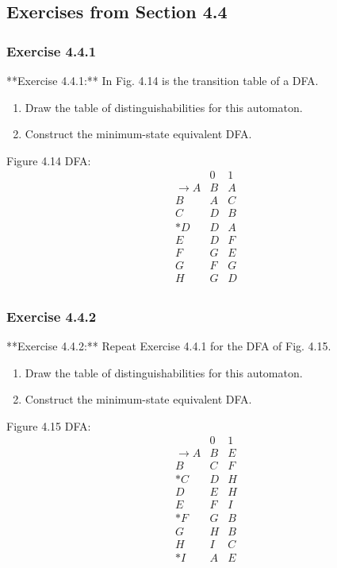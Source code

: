 \documentclass{article}
\begin{document}
\subsection{Exercises from Section 4.4}

\subsubsection*{Exercise 4.4.1}
**Exercise 4.4.1:** In Fig. 4.14 is the transition table of a DFA.
\begin{enumerate}[label=\alph*)]
  \item Draw the table of distinguishabilities for this automaton.
  \item Construct the minimum-state equivalent DFA.
\end{enumerate}

Figure 4.14 DFA:
\[
\begin{array}{r||c|c|}
  & 0 & 1 \\
  \hline\hline
  \rightarrow A & B & A \\
  B & A & C \\
  C & D & B \\
  *D & D & A \\
  E & D & F \\
  F & G & E \\
  G & F & G \\
  H & G & D \\
\end{array}
\]

\subsubsection*{Exercise 4.4.2}
**Exercise 4.4.2:** Repeat Exercise 4.4.1 for the DFA of Fig. 4.15.
\begin{enumerate}[label=\alph*)]
  \item Draw the table of distinguishabilities for this automaton.
  \item Construct the minimum-state equivalent DFA.
\end{enumerate}

Figure 4.15 DFA:
\[
\begin{array}{r||c|c|}
  & 0 & 1 \\
  \hline\hline
  \rightarrow A & B & E \\
  B & C & F \\
  *C & D & H \\
  D & E & H \\
  E & F & I \\
  *F & G & B \\
  G & H & B \\
  H & I & C \\
  *I & A & E \\
\end{array}
\]
\end{document}

